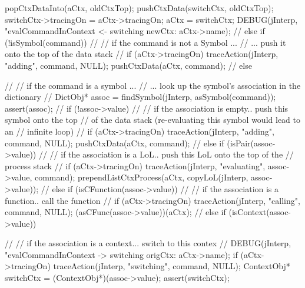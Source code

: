 {{{      popCtxDataInto(aCtx, oldCtxTop);
      pushCtxData(switchCtx, oldCtxTop);
      switchCtx->tracingOn = aCtx->tracingOn;
      aCtx = switchCtx;
      DEBUG(jInterp, "evalCommandInContext <- switching newCtx: %
            aCtx->name);
      //
    } else if (!isSymbol(command)) {
      //
      // if the command is not a Symbol ...
      //  ...  push it onto the top of the data stack
      //
      if (aCtx->tracingOn)
        traceAction(jInterp, "adding", command, NULL);
      pushCtxData(aCtx, command);
      //
    } else {
      //
      // if the command is a symbol ...
      //  ... look up the symbol's association in the dictionary
      //
      DictObj* assoc = findSymbol(jInterp, asSymbol(command));
      assert(assoc);
      //
      if (!assoc->value) {
        //
        // if the association is empty.. push this symbol onto the top
        // of the data stack (re-evaluating this symbol would lead to an
        // infinite loop)
        //
        if (aCtx->tracingOn)
          traceAction(jInterp, "adding", command, NULL);
        pushCtxData(aCtx, command);
        //
      } else if (isPair(assoc->value)) {
        //
        // if the association is a LoL.. push this LoL onto the top of the
        // process stack
        //
        if (aCtx->tracingOn)
          traceAction(jInterp, "evaluating", assoc->value, command);
        prependListCtxProcess(aCtx,
          copyLoL(jInterp, assoc->value));
        //
      } else if (isCFunction(assoc->value)) {
        //
        // if the association is a function.. call the function
        //
        if (aCtx->tracingOn)
          traceAction(jInterp, "calling", command, NULL);
        (asCFunc(assoc->value))(aCtx);
        //
      } else if (isContext(assoc->value)) {
        //
        // if the association is a context... switch to this contex
        //
        DEBUG(jInterp, "evalCommandInContext -> switching origCtx: %
              aCtx->name);
        if (aCtx->tracingOn)
          traceAction(jInterp, "switching", command, NULL);
        ContextObj* switchCtx = (ContextObj*)(assoc->value);
        assert(switchCtx);

}}}}
